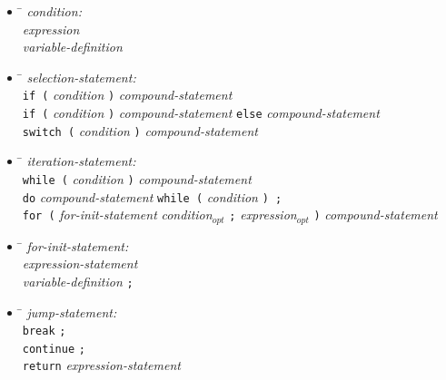 \begin{itemize}
\item \begin{tabbing}
  \qquad \qquad \= \kill
  \emph{condition:}\\
  \> \emph{expression} \\
  \> \emph{variable-definition}
\end{tabbing}

\item \begin{tabbing}
  \qquad \qquad \= \kill
  \emph{selection-statement:}\\
  \> \verb|if (| \emph{condition} \verb|)| \emph{compound-statement} \\
  \> \verb|if (| \emph{condition} \verb|)| \emph{compound-statement} \verb|else| \emph{compound-statement} \\
  \> \verb|switch (| \emph{condition} \verb|)| \emph{compound-statement}
\end{tabbing}

\item \begin{tabbing}
  \qquad \qquad \= \kill
  \emph{iteration-statement:}\\
  \> \verb|while (| \emph{condition} \verb|)| \emph{compound-statement} \\
  \> \verb|do| \emph{compound-statement} \verb|while (| \emph{condition} \verb|) ;| \\
  \> \verb|for (| \emph{for-init-statement} \emph{condition$_{opt}$} \verb|;| \emph{expression$_{opt}$} \verb|)| \emph{compound-statement}
\end{tabbing}

\item \begin{tabbing}
  \qquad \qquad \= \kill
  \emph{for-init-statement:}\\
  \> \emph{expression-statement} \\
  \> \emph{variable-definition} \verb|;|
\end{tabbing}

\item \begin{tabbing}
  \qquad \qquad \= \kill
  \emph{jump-statement:}\\
  \> \verb|break| \verb|;| \\
  \> \verb|continue| \verb|;| \\
  \> \verb|return| \emph{expression-statement}
\end{tabbing}
\end{itemize}


